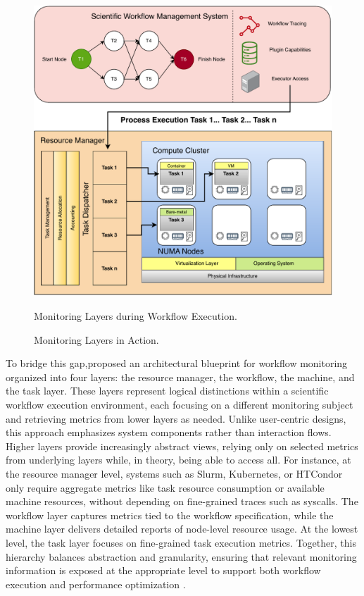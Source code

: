 \begin{figure}[H]
    \centering
    \includegraphics[scale=0.5]{fig/02/02-monitoring-layers2.pdf}
    \caption{Monitoring Layers in Action.}
    \label{fig:02-monitoring-layers2}
    \tiny
    Monitoring Layers during Workflow Execution.
\end{figure}

To bridge this gap,proposed an architectural blueprint for workflow monitoring organized into four layers: the resource manager, the workflow, the machine, and the task layer. These layers represent logical distinctions within a scientific workflow execution environment, each focusing on a different monitoring subject and retrieving metrics from lower layers as needed. Unlike user-centric designs, this approach emphasizes system components rather than interaction flows. Higher layers provide increasingly abstract views, relying only on selected metrics from underlying layers while, in theory, being able to access all. For instance, at the resource manager level, systems such as Slurm, Kubernetes, or HTCondor only require aggregate metrics like task resource consumption or available machine resources, without depending on fine-grained traces such as syscalls. The workflow layer captures metrics tied to the workflow specification, while the machine layer delivers detailed reports of node-level resource usage. At the lowest level, the task layer focuses on fine-grained task execution metrics. Together, this hierarchy balances abstraction and granularity, ensuring that relevant monitoring information is exposed at the appropriate level to support both workflow execution and performance optimization \cite{Bader_2022}.

